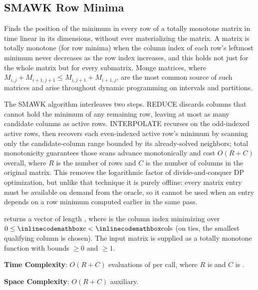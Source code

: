 \subsection{SMAWK Row Minima}
\label{sec:5.3.2}
Finds the position of the minimum in every row of a totally monotone matrix in time linear in its dimensions, without ever materializing the matrix. A matrix is totally monotone (for row minima) when the column index of each row's leftmost minimum never decreases as the row index increases, and this holds not just for the whole matrix but for every submatrix. Monge matrices, where $M_{i,j} + M_{i+1,j+1} \leq M_{i,j+1} + M_{i+1,j}$, are the most common source of such matrices and arise throughout dynamic programming on intervals and partitions.

The SMAWK algorithm interleaves two steps. REDUCE discards columns that cannot hold the minimum of any remaining row, leaving at most as many candidate columns as active rows. INTERPOLATE recurses on the odd-indexed active rows, then recovers each even-indexed active row's minimum by scanning only the candidate-column range bounded by its already-solved neighbors; total monotonicity guarantees those scans advance monotonically and cost $O(R + C)$ overall, where $R$ is the number of rows and $C$ is the number of columns in the original matrix. This removes the logarithmic factor of divide-and-conquer DP optimization, but unlike that technique it is purely offline: every matrix entry must be available on demand from the oracle, so it cannot be used when an entry depends on a row minimum computed earlier in the same pass.

\begin{compactitem}
  \item {} returns a vector  of length , where  is the column index minimizing  over $0 \leq {\inlinecodemath{c}} < {\inlinecodemath{cols}}$ (on ties, the smallest qualifying column is chosen). The input matrix is supplied as a totally monotone function  with bounds  $\geq 0$ and  $\geq 1$.
\end{compactitem}

\textbf{Time Complexity}: $O(R + C)$ evaluations of  per call, where $R$ is  and $C$ is .

\textbf{Space Complexity}: $O(R + C)$ auxiliary.

